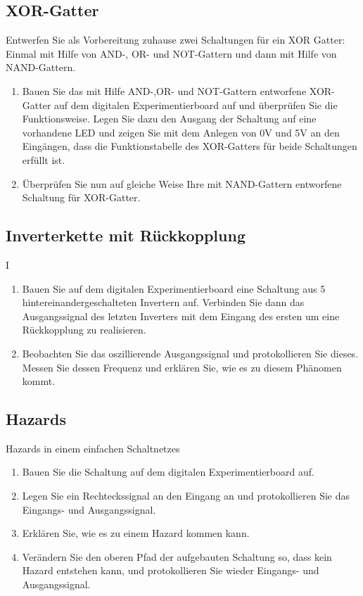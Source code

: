 \documentclass[paper=a4, fontsize=11pt]{scrartcl}
\numberwithin{equation}{section}
\numberwithin{figure}{section}
\numberwithin{table}{section}
\begin{document}
\subsection{XOR-Gatter}

Entwerfen Sie als Vorbereitung zuhause zwei Schaltungen für ein XOR Gatter: Einmal mit Hilfe von AND-, OR- und NOT-Gattern und dann mit Hilfe von NAND-Gattern. \\

\begin{enumerate}
\item Bauen Sie das mit Hilfe AND-,OR- und NOT-Gattern entworfene XOR-Gatter auf dem digitalen Experimentierboard auf und überprüfen Sie die Funktionsweise. Legen Sie dazu den Ausgang der Schaltung auf eine vorhandene LED und zeigen Sie mit dem Anlegen von 0V und 5V an den Eingängen, dass die Funktionstabelle des XOR-Gatters für beide Schaltungen erfüllt ist. 
\item Überprüfen Sie nun auf gleiche Weise Ihre mit NAND-Gattern entworfene Schaltung für XOR-Gatter.
\end{enumerate}

\subsection{Inverterkette mit Rückkopplung}

I\begin{enumerate}
\item Bauen Sie auf dem digitalen Experimentierboard eine Schaltung aus 5 hintereinandergeschalteten Invertern auf. Verbinden Sie dann das Ausgangssignal des letzten Inverters mit dem Eingang des ersten um eine Rückkopplung zu realisieren.
\item Beobachten Sie das oszillierende Ausgangssignal und protokollieren Sie dieses. Messen Sie dessen Frequenz und erklären Sie, wie es zu diesem Phänomen kommt.
\end{enumerate}

\subsection{Hazards}

Hazards in einem einfachen Schaltnetzes \\

\begin{enumerate}
\item Bauen Sie die Schaltung auf dem digitalen Experimentierboard auf.
\item Legen Sie ein Rechteckssignal an den Eingang an und protokollieren Sie das Eingangs- und Ausgangssignal.
\item Erklären Sie, wie es zu einem Hazard kommen kann.
\item Verändern Sie den oberen Pfad der aufgebauten Schaltung so, dass kein Hazard entstehen kann, und protokollieren Sie wieder Eingangs- und Ausgangssignal.
\end{enumerate}
\end{document}
